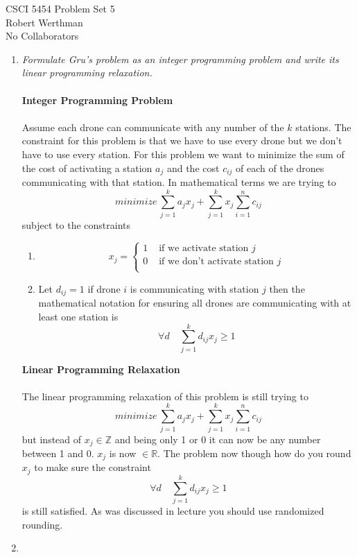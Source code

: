 \documentclass[12pt]{article}
\begin{document}
CSCI 5454 \hfill Problem Set 5\\
Robert Werthman\\
No Collaborators

\hrulefill

\begin{enumerate}
  
  \item \textit{Formulate Gru's problem as an integer programming problem and
  write its linear programming relaxation.}\\
  \\
  \textbf{Integer Programming Problem}\\
  \\
  Assume each drone can communicate with any number of the $k$ stations. The
  constraint for this problem is that we have to use every drone but we don't
  have to use every station.  For this problem we want to minimize the sum of
  the cost of activating a station $a_j$ and the cost $c_{ij}$ of each of the
  drones communicating with that station.  In mathematical terms we are trying to 
  $$ 
  minimize\,\sum_{j=1}^{k} a_jx_j + \sum_{j = 1}^{k} x_j\sum_{i=1}^{n} c_{ij}
  $$ 
  subject to the constraints
  \begin{enumerate} 
  \item
  $$
  x_j = 
  \begin{cases}
  1 & \text{ if we activate station }j\\
  0 & \text{ if we don't activate station }j\\
  \end{cases}
  $$
  \item
  Let $d_{ij} = 1$ if drone $i$ is communicating with station $j$ 
  then the mathematical notation for ensuring all drones are communicating with
  at least one station is 
  $$
  \forall d \quad \sum_{j=1}^{k} d_{ij}x_j \ge 1
  $$
  \end{enumerate}

  \textbf{Linear Programming Relaxation}\\
  \\
  The linear programming relaxation of this problem is still trying to
  $$ 
  minimize\,\sum_{j=1}^{k} a_jx_j + \sum_{j = 1}^{k} x_j\sum_{i=1}^{n} c_{ij}
  $$
  but instead of $x_j \in \mathbb{Z}$ and being only 1 or 0 it can now be any
  number between 1 and 0.  $x_j$ is now $\in \mathbb{R}$.  The problem now
  though how do you round $x_j$ to make sure the constraint
  $$
  \forall d \quad \sum_{j=1}^{k} d_{ij}x_j \ge 1
  $$
  is still satisfied.  As was discussed in lecture you should use randomized
  rounding.
  
  \newpage
  \item \textit{}
\end{enumerate}
\end{document}
